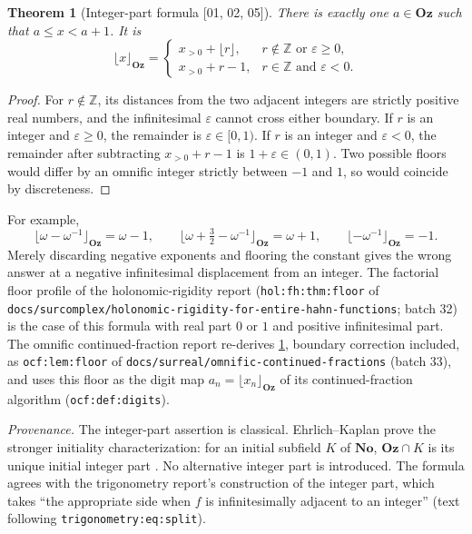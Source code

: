 \documentclass[11pt,oneside]{article}
\numberwithin{equation}{section}
\newtheorem{theorem}{Theorem}[section]
\theoremstyle{definition}
\theoremstyle{remark}
\newcommand{\No}{\mathbf{No}}
\newcommand{\Oz}{\mathbf{Oz}}
\newcommand{\Z}{\mathbb Z}
\newcommand{\src}[1]{\textup{\textsf{\small[#1]}}}
\newcommand{\status}[1]{\par\smallskip\noindent\textit{Provenance.} #1\par\smallskip}
\newcommand{\replabel}[1]{\nolinkurl{#1}}
\newcommand{\fn}[1]{\nolinkurl{#1}}
\begin{document}
\begin{theorem}[Integer-part formula \src{01, 02, 05}]\label{odg:thm:floor}
There is exactly one $a\in\Oz$ such that $a\leq x<a+1$. It is
\begin{equation}\label{odg:eq:floor}
 \lfloor x\rfloor_{\Oz}=
 \begin{cases}
 x_{>0}+\lfloor r\rfloor,&r\notin\Z\text{ or }\varepsilon\geq0,\\
 x_{>0}+r-1,&r\in\Z\text{ and }\varepsilon<0.
 \end{cases}
\end{equation}
\end{theorem}
\begin{proof}
For $r\notin\Z$, its distances from the two adjacent integers are
strictly positive real numbers, and the infinitesimal $\varepsilon$ cannot
cross either boundary. If $r$ is an integer and $\varepsilon\ge0$, the
remainder is $\varepsilon\in[0,1)$. If $r$ is an integer and $\varepsilon<0$,
the remainder after subtracting $x_{>0}+r-1$ is $1+\varepsilon\in(0,1)$.
Two possible floors would differ by an omnific integer strictly between $-1$
and $1$, so would coincide by discreteness.
\end{proof}

For example,
\[
 \lfloor\omega-\omega^{-1}\rfloor_{\Oz}=\omega-1,
 \qquad \lfloor\omega+\tfrac32-\omega^{-1}\rfloor_{\Oz}=\omega+1,
 \qquad \lfloor-\omega^{-1}\rfloor_{\Oz}=-1.
\]
Merely discarding negative exponents and flooring the constant gives the
wrong answer at a negative infinitesimal displacement from an integer.
The factorial floor profile of the holonomic-rigidity report
(\replabel{hol:fh:thm:floor} of
\fn{docs/surcomplex/holonomic-rigidity-for-entire-hahn-functions}; batch 32) is
the case of this formula with real part $0$ or $1$ and positive infinitesimal
part.
The omnific continued-fraction report re-derives \cref{odg:thm:floor},
boundary correction included, as \replabel{ocf:lem:floor} of
\fn{docs/surreal/omnific-continued-fractions} (batch 33), and uses this floor
as the digit map $a_n=\lfloor x_n\rfloor_{\Oz}$ of its continued-fraction
algorithm (\replabel{ocf:def:digits}).

\status{The integer-part assertion is classical. Ehrlich--Kaplan prove the
stronger initiality characterization: for an initial subfield $K$ of
$\No$, $\Oz\cap K$ is its unique initial integer part
\cite[Lemma 11.1]{EK}. No alternative integer part is introduced. The formula
agrees with the trigonometry report's construction of the integer part, which
takes ``the appropriate side when $f$ is infinitesimally adjacent to an
integer'' (text following \replabel{trigonometry:eq:split}).}
\end{document}
